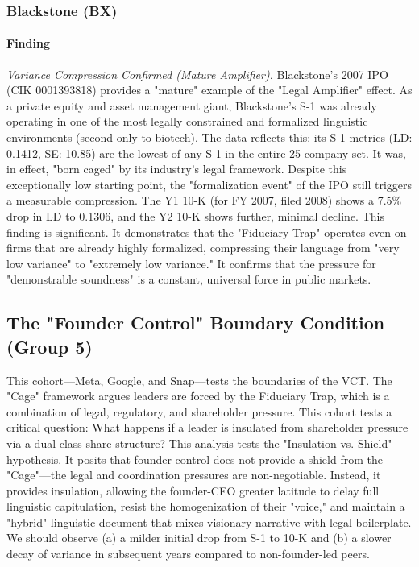 \documentclass[12pt, letterpaper]{article}
\begin{document}
\subsubsection{Blackstone (BX)}
\paragraph{Finding} \textit{Variance Compression Confirmed (Mature Amplifier).}
Blackstone's 2007 IPO (CIK 0001393818) provides a "mature" example of the "Legal Amplifier" effect. As a private equity and asset management giant, Blackstone's S-1 was already operating in one of the most legally constrained and formalized linguistic environments (second only to biotech). The data reflects this: its S-1 metrics (LD: 0.1412, SE: 10.85) are the lowest of any S-1 in the entire 25-company set. It was, in effect, "born caged" by its industry's legal framework. Despite this exceptionally low starting point, the "formalization event" of the IPO still triggers a measurable compression. The Y1 10-K (for FY 2007, filed 2008) shows a 7.5\% drop in LD to 0.1306, and the Y2 10-K shows further, minimal decline. This finding is significant. It demonstrates that the "Fiduciary Trap" operates even on firms that are already highly formalized, compressing their language from "very low variance" to "extremely low variance." It confirms that the pressure for "demonstrable soundness" is a constant, universal force in public markets.

\subsection{The "Founder Control" Boundary Condition (Group 5)}
This cohort—Meta, Google, and Snap—tests the boundaries of the VCT. The "Cage" framework argues leaders are forced by the Fiduciary Trap, which is a combination of legal, regulatory, and shareholder pressure. This cohort tests a critical question: What happens if a leader is insulated from shareholder pressure via a dual-class share structure? This analysis tests the "Insulation vs. Shield" hypothesis. It posits that founder control does not provide a shield from the "Cage"—the legal and coordination pressures are non-negotiable. Instead, it provides insulation, allowing the founder-CEO greater latitude to delay full linguistic capitulation, resist the homogenization of their "voice," and maintain a "hybrid" linguistic document that mixes visionary narrative with legal boilerplate. We should observe (a) a milder initial drop from S-1 to 10-K and (b) a slower decay of variance in subsequent years compared to non-founder-led peers.
\end{document}
